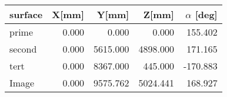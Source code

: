 \begin{tabular}{lrrrr}
\toprule
surface &  X[mm] &    Y[mm] &    Z[mm] &  $\alpha$ [deg] \\
\midrule
  prime &  0.000 &    0.000 &    0.000 &      155.402 \\
 second &  0.000 & 5615.000 & 4898.000 &      171.165 \\
   tert &  0.000 & 8367.000 &  445.000 &     -170.883 \\
  Image &  0.000 & 9575.762 & 5024.441 &      168.927 \\
\bottomrule
\end{tabular}
